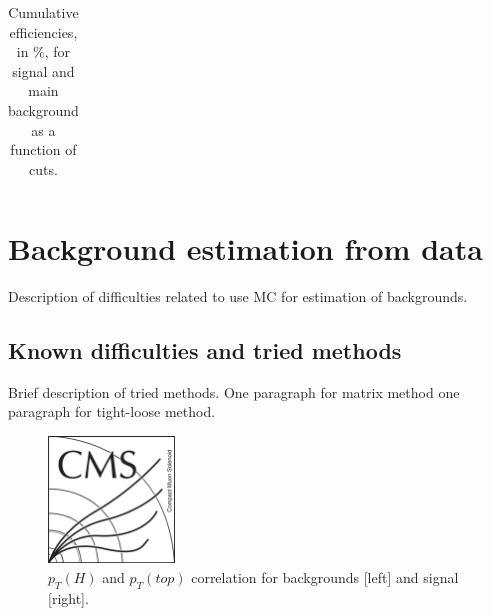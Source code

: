 \begin{table}[htbH]
\begin{center}
{\begin{tabular}{|c|c|c|c|c|c|}
\hline
\end{tabular}
}
\caption{Cumulative efficiencies, in \%, for signal and main background as a function of cuts.\label{tab:cutflow}}
\end{center}
\end{table}\clearpage

\section{Background estimation from data}
\label{sec:bkg}

Description of difficulties related to use MC for estimation of backgrounds.

\subsection{Known difficulties and tried methods}
\label{sec:tried}

Brief description of tried methods. One paragraph for matrix method one paragraph for tight-loose method.

\begin{figure}[!Hhtbp]
  \begin{center}
    \includegraphics[width=0.3\textwidth]{figs/CMSlogo.png}
    \caption{$p_{T}(H)$ and $p_{T}(top)$ correlation for backgrounds [left] and signal [right].}
    \label{fig:HptTpt}
  \end{center}
\end{figure}\clearpage

